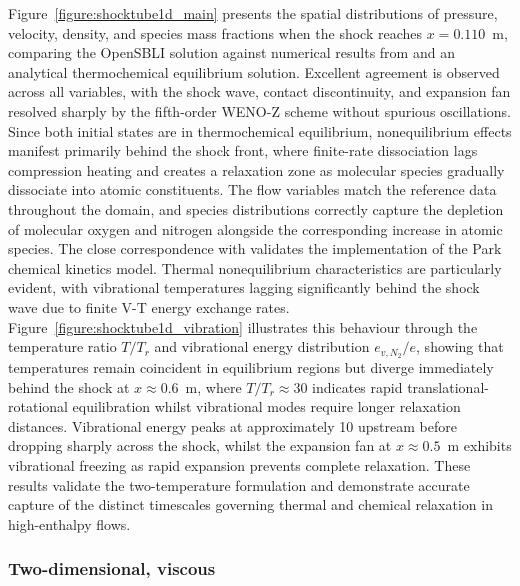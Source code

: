 Figure~\ref{figure:shocktube1d_main} presents the spatial distributions of pressure, velocity, density, and species mass fractions when the shock reaches $x = 0.110$~m, comparing the OpenSBLI solution against numerical results from \citet{GrossmanCinnella1990} and an analytical thermochemical equilibrium solution. Excellent agreement is observed across all variables, with the shock wave, contact discontinuity, and expansion fan resolved sharply by the fifth-order WENO-Z scheme without spurious oscillations. Since both initial states are in thermochemical equilibrium, nonequilibrium effects manifest primarily behind the shock front, where finite-rate dissociation lags compression heating and creates a relaxation zone as molecular species gradually dissociate into atomic constituents. The flow variables match the reference data throughout the domain, and species distributions correctly capture the depletion of molecular oxygen and nitrogen alongside the corresponding increase in atomic species. The close correspondence with \citet{GrossmanCinnella1990} validates the implementation of the Park \citep{Park1990} chemical kinetics model. Thermal nonequilibrium characteristics are particularly evident, with vibrational temperatures lagging significantly behind the shock wave due to finite V-T energy exchange rates. Figure~\ref{figure:shocktube1d_vibration} illustrates this behaviour through the temperature ratio $T/T_r$ and vibrational energy distribution $e_{v,N_2}/e$, showing that temperatures remain coincident in equilibrium regions but diverge immediately behind the shock at $x \approx 0.6$~m, where $T/T_r \approx 30$ indicates rapid translational-rotational equilibration whilst vibrational modes require longer relaxation distances. Vibrational energy peaks at approximately 10 upstream before dropping sharply across the shock, whilst the expansion fan at $x \approx 0.5$~m exhibits vibrational freezing as rapid expansion prevents complete relaxation. These results validate the two-temperature formulation and demonstrate accurate capture of the distinct timescales governing thermal and chemical relaxation in high-enthalpy flows. 


\subsubsection{Two-dimensional, viscous}

